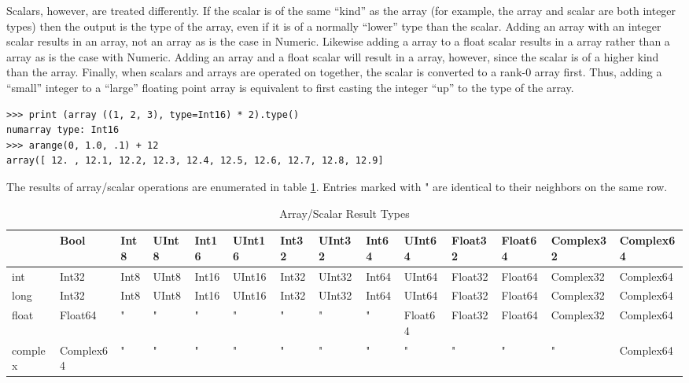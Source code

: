 Scalars, however, are treated differently. If the scalar is of the same
``kind'' as the array (for example, the array and scalar are both integer
types) then the output is the type of the array, even if it is of a normally
``lower'' type than the scalar.  Adding an  array with an integer
scalar results in an  array, not an  array as is the
case in Numeric.  Likewise adding a  array to a float scalar
results in a  array rather than a  array as is
the case with Numeric.  Adding an  array and a float scalar will
result in a  array, however, since the scalar is of a higher
kind than the array.  Finally, when scalars and arrays are operated on
together, the scalar is converted to a rank-0 array first.  Thus, adding a
``small'' integer to a ``large'' floating point array is equivalent to first
casting the integer ``up'' to the type of the array.
\begin{verbatim}
>>> print (array ((1, 2, 3), type=Int16) * 2).type()
numarray type: Int16
>>> arange(0, 1.0, .1) + 12
array([ 12. , 12.1, 12.2, 12.3, 12.4, 12.5, 12.6, 12.7, 12.8, 12.9]
\end{verbatim}

The results of array/scalar operations are enumerated in table
\ref{tab:Array-Scalar-Result-Types}.  Entries marked with " are identical to
their neighbors on the same row.
\begin{table}[h]
\footnotesize
\centering
\caption{Array/Scalar Result Types}
\label{tab:Array-Scalar-Result-Types}
\begin{tabular}{|l|l|l|l|l|l|l|l|l|l|l|l|l|l|}
\hline
 &Bool&Int8&UInt8&Int16&UInt16&Int32&UInt32&Int64&UInt64&Float32&Float64&Complex32&Complex64\\
\hline
int&Int32&Int8&UInt8&Int16&UInt16&Int32&UInt32&Int64&UInt64&Float32&Float64&Complex32&Complex64\\
\hline
long&Int32&Int8&UInt8&Int16&UInt16&Int32&UInt32&Int64&UInt64&Float32&Float64&Complex32&Complex64\\
\hline
float&Float64&"&"&"&"&"&"&"&Float64&Float32&Float64&Complex32&Complex64\\
\hline
complex&Complex64&"&"&"&"&"&"&"&"&"&"&"&Complex64\\
\hline
\end{tabular}
\end{table}


